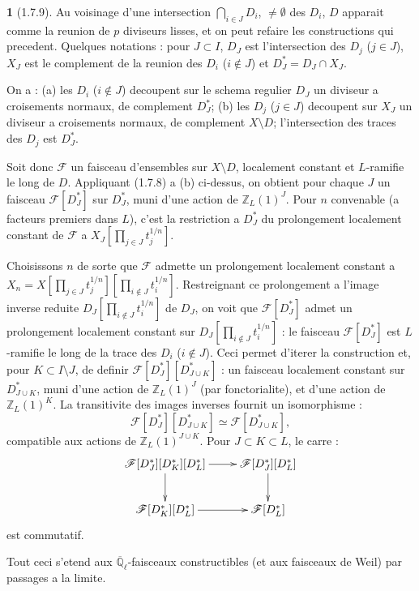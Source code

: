 \documentclass[12pt,a4paper]{article}
\theoremstyle{plain}
\theoremstyle{definition}
\theoremstyle{definition}
\newtheorem{para}{}[section]
\theoremstyle{remark}
\begin{document}
\begin{para}[1.7.9]
Au voisinage d'une intersection $\bigcap_{i \in J} D_i$, $\neq \emptyset$ des $D_i$, $D$ apparait comme la reunion de $p$ diviseurs lisses, et on peut refaire les constructions qui precedent. Quelques notations : pour $J \subset I$, $D_J$ est l'intersection des $D_j$ ($j \in J$), $X_J$ est le complement de la reunion des $D_i$ ($i \notin J$) et $D_J^* = D_J \cap X_J$.

On a : (a) les $D_i$ ($i \notin J$) decoupent sur le schema regulier $D_J$ un diviseur a croisements normaux, de complement $D_J^*$; (b) les $D_j$ ($j \in J$) decoupent sur $X_J$ un diviseur a croisements normaux, de complement $X \setminus D$; l'intersection des traces des $D_j$ est $D_J^*$.

Soit donc $\mathscr{F}$ un faisceau d'ensembles sur $X \setminus D$, localement constant et $L$-ramifie le long de $D$. Appliquant (1.7.8) a (b) ci-dessus, on obtient pour chaque $J$ un faisceau $\mathscr{F}[D_J^*]$ sur $D_J^*$, muni d'une action de $\mathbb{Z}_L(1)^J$. Pour $n$ convenable (a facteurs premiers dans $L$), c'est la restriction a $D_J^*$ du prolongement localement constant de $\mathscr{F}$ a $X_J[\prod_{j \in J} t_j^{1/n}]$.

Choisissons $n$ de sorte que $\mathscr{F}$ admette un prolongement localement constant a $X_n = X[\prod_{j \in J} t_j^{1/n}][\prod_{i \notin J} t_i^{1/n}]$. Restreignant ce prolongement a l'image inverse reduite $D_J[\prod_{i \notin J} t_i^{1/n}]$ de $D_J$, on voit que $\mathscr{F}[D_J^*]$ admet un prolongement localement constant sur $D_J[\prod_{i \notin J} t_i^{1/n}]$ : le faisceau $\mathscr{F}[D_J^*]$ est $L$-ramifie le long de la trace des $D_i$ ($i \notin J$). Ceci permet d'iterer la construction et, pour $K \subset I \setminus J$, de definir $\mathscr{F}[D_J^*][D_{J \cup K}^*]$ : un faisceau localement constant sur $D_{J \cup K}^*$, muni d'une action de $\mathbb{Z}_L(1)^J$ (par fonctorialite), et d'une action de $\mathbb{Z}_L(1)^K$. La transitivite des images inverses fournit un isomorphisme :
\begin{equation}\tag{1.7.9.1}
\mathscr{F}[D_J^*][D_{J \cup K}^*] \simeq \mathscr{F}[D_{J \cup K}^*],
\end{equation}
compatible aux actions de $\mathbb{Z}_L(1)^{J \cup K}$. Pour $J \subset K \subset L$, le carre :
\[\xymatrix{
\mathscr{F}[D_J^*][D_K^*][D_L^*] \ar[r] \ar[d] & \mathscr{F}[D_J^*][D_L^*] \ar[d] \\
\mathscr{F}[D_K^*][D_L^*] \ar[r] & \mathscr{F}[D_L^*]
}\]
est commutatif.

Tout ceci s'etend aux $\overline{\mathbb{Q}}_\ell$-faisceaux constructibles (et aux faisceaux de Weil) par passages a la limite.
\end{para}
\end{document}
